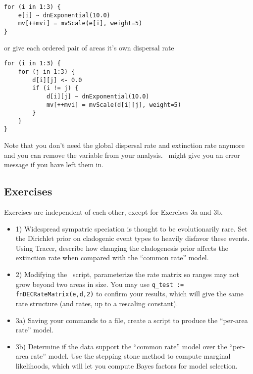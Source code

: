 \begin{snugshade}
\begin{lstlisting}
for (i in 1:3) {
    e[i] ~ dnExponential(10.0)
    mv[++mvi] = mvScale(e[i], weight=5)
}
\end{lstlisting}
\end{snugshade}

or give each ordered pair of areas it's own dispersal rate

\begin{snugshade}
\begin{lstlisting}
for (i in 1:3) {
    for (j in 1:3) {
    	d[i][j] <- 0.0
        if (i != j) {
            d[i][j] ~ dnExponential(10.0)
            mv[++mvi] = mvScale(d[i][j], weight=5)
        }
    }
}
\end{lstlisting}
\end{snugshade}
Note that you don't need the global dispersal rate  and extinction rate  anymore and you can remove the variable from your analysis. \RevBayes~might give you an error message if you have left them in.

\subsection{Exercises}

Exercises are independent of each other, except for Exercises 3a and 3b.

\begin{itemize}
\item 1) Widespread sympatric speciation is thought to be evolutionarily rare. Set the Dirichlet prior on cladogenic event types to heavily disfavor these events. Using Tracer, describe how changing the cladogenesis prior affects the extinction rate when compared with the ``common rate'' model.
\item 2) Modifying the \RevBayes~script, parameterize the rate matrix so ranges may not grow beyond two areas in size. You may use {\tt q\_test := fnDECRateMatrix(e,d,2)} to confirm your results, which will give the same rate structure (and rates, up to a rescaling constant).
\item 3a) Saving your commands to a file, create a script to produce the ``per-area rate'' model.
\item 3b) Determine if the data support the ``common rate'' model over the ``per-area rate'' model. Use the stepping stone method to compute marginal likelihoods, which will let you compute Bayes factors for model selection.
\end{itemize}

